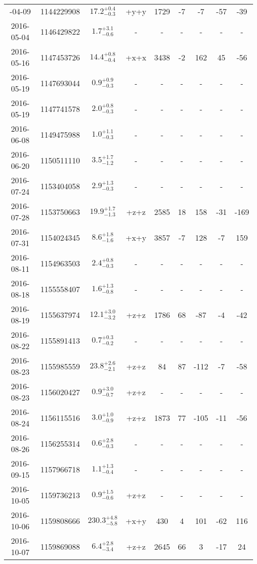 \begin{longtable}{|c|c|c|c|c|c|c|c|c|}
		\hline
		\endlastfoot
	2016-04-09 & 1144229908 & $17.2^{+0.4}_{-0.3}$ & +y+y & 1729 & -7 & -7 & -57 & -39 \\
	2016-05-04 & 1146429822 & $ 1.7^{+3.1}_{-0.6}$ & - & - & - & - & - & - \\
	2016-05-16 & 1147453726 & $14.4^{+0.8}_{-0.4}$ & +x+x & 3438 & -2 & 162 & 45 & -56 \\
	2016-05-19 & 1147693044 & $ 0.9^{+0.9}_{-0.3}$ & - & - & - & - & - & - \\
	2016-05-19 & 1147741578 & $ 2.0^{+0.8}_{-0.3}$ & - & - & - & - & - & - \\
	2016-06-08 & 1149475988 & $ 1.0^{+1.1}_{-0.3}$ & - & - & - & - & - & - \\
	2016-06-20 & 1150511110 & $ 3.5^{+1.7}_{-1.2}$ & - & - & - & - & - & - \\
	2016-07-24 & 1153404058 & $ 2.9^{+1.3}_{-0.3}$ & - & - & - & - & - & - \\
	2016-07-28 & 1153750663 & $19.9^{+1.7}_{-1.3}$ & +z+z & 2585 & 18 & 158 & -31 & -169 \\
	2016-07-31 & 1154024345 & $ 8.6^{+1.8}_{-1.6}$ & +x+y & 3857 & -7 & 128 & -7 & 159 \\
	2016-08-11 & 1154963503 & $ 2.4^{+0.8}_{-0.3}$ & - & - & - & - & - & - \\
	2016-08-18 & 1155558407 & $ 1.6^{+1.3}_{-0.8}$ & - & - & - & - & - & - \\
	2016-08-19 & 1155637974 & $12.1^{+3.0}_{-3.2}$ & +z+z & 1786 & 68 & -87 & -4 & -42 \\
	2016-08-22 & 1155891413 & $ 0.7^{+0.3}_{-0.2}$ & - & - & - & - & - & - \\
	2016-08-23 & 1155985559 & $23.8^{+2.6}_{-2.1}$ & +z+z & 84 & 87 & -112 & -7 & -58 \\
	2016-08-23 & 1156020427 & $ 0.9^{+3.0}_{-0.7}$ & +z+z & - & - & - & - & - \\
	2016-08-24 & 1156115516 & $ 3.0^{+1.0}_{-0.9}$ & +z+z & 1873 & 77 & -105 & -11 & -56 \\
	2016-08-26 & 1156255314 & $ 0.6^{+2.8}_{-0.3}$ & - & - & - & - & - & - \\
	2016-09-15 & 1157966718 & $ 1.1^{+1.3}_{-0.4}$ & - & - & - & - & - & - \\
	2016-10-05 & 1159736213 & $ 0.9^{+1.5}_{-0.6}$ & +z+z & - & - & - & - & - \\
	2016-10-06 & 1159808666 & $230.3^{+4.8}_{-5.8}$ & +x+y & 430 & 4 & 101 & -62 & 116 \\
	2016-10-07 & 1159869088 & $ 6.4^{+2.8}_{-3.4}$ & +z+z & 2645 & 66 & 3 & -17 & 24 \\

\end{longtable}
